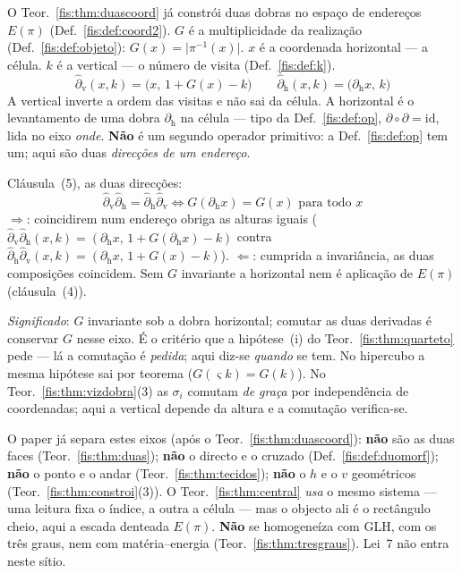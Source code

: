 \documentclass[livro.tex]{subfiles}
\begin{document}
\begin{observacao}\label{fis:obs:quantica-comuta-dobras}
O Teor.~\ref{fis:thm:duascoord} já constrói duas dobras no
espaço de endereços \(E(\pi)\) (Def.~\ref{fis:def:coord2}).
\(G\) é a multiplicidade da realização
(Def.~\ref{fis:def:objeto}): \(G(x)=\lvert\pi^{-1}(x)\rvert\).
\(x\) é a coordenada horizontal --- a célula.
\(k\) é a vertical --- o número de visita
(Def.~\ref{fis:def:k}).
\[
\boxed{\;
\hat\partial_{\mathrm{v}}(x,k)=\bigl(x,\,1+G(x)-k\bigr)
\qquad
\hat\partial_{\mathrm{h}}(x,k)=\bigl(\partial_{\mathrm{h}}x,\,k\bigr)
\;}
\]
A vertical inverte a ordem das visitas e não sai da célula.
A horizontal é o levantamento de uma dobra
\(\partial_{\mathrm{h}}\) na célula --- tipo da
Def.~\ref{fis:def:op}, \(\partial\circ\partial=\mathrm{id}\),
lida no eixo \emph{onde}.
\textbf{Não} é um segundo operador primitivo: a
Def.~\ref{fis:def:op} tem um; aqui são duas
\emph{direcções de um endereço}.

Cláusula~(5), as duas direcções:
\[
\boxed{\;
\hat\partial_{\mathrm{v}}\hat\partial_{\mathrm{h}}
=\hat\partial_{\mathrm{h}}\hat\partial_{\mathrm{v}}
\iff
G(\partial_{\mathrm{h}}x)=G(x)
\text{ para todo }x
\;}
\]
\(\Rightarrow\): coincidirem num endereço obriga as
alturas iguais
(\(\hat\partial_{\mathrm{v}}\hat\partial_{\mathrm{h}}(x,k)
=(\partial_{\mathrm{h}}x,\,1+G(\partial_{\mathrm{h}}x)-k)\)
contra
\(\hat\partial_{\mathrm{h}}\hat\partial_{\mathrm{v}}(x,k)
=(\partial_{\mathrm{h}}x,\,1+G(x)-k)\)).
\(\Leftarrow\): cumprida a invariância, as duas
composições coincidem. Sem \(G\) invariante a
horizontal nem é aplicação de \(E(\pi)\)
(cláusula~(4)).

\emph{Significado}: \(G\) invariante sob a dobra
horizontal; comutar as duas derivadas é conservar
\(G\) nesse eixo. É o critério que a hipótese~(i)
do Teor.~\ref{fis:thm:quarteto} pede --- lá a
comutação é \emph{pedida}; aqui diz-se
\emph{quando} se tem.
No hipercubo a mesma hipótese sai por teorema
(\(G(\varsigma k)=G(k)\)).
No Teor.~\ref{fis:thm:vizdobra}(3) as \(\sigma_i\)
comutam \emph{de graça} por independência de
coordenadas; aqui a vertical depende da altura e
a comutação verifica-se.

O paper já separa estes eixos
(após o Teor.~\ref{fis:thm:duascoord}):
\textbf{não} são as duas faces
(Teor.~\ref{fis:thm:duas});
\textbf{não} o directo e o cruzado
(Def.~\ref{fis:def:duomorf});
\textbf{não} o ponto e o andar
(Teor.~\ref{fis:thm:tecidos});
\textbf{não} o \(h\) e o \(v\) geométricos
(Teor.~\ref{fis:thm:constroi}(3)).
O Teor.~\ref{fis:thm:central} \emph{usa} o mesmo
sistema --- uma leitura fixa o índice, a outra a
célula --- mas o objecto ali é o rectângulo cheio,
aqui a escada denteada \(E(\pi)\).
\textbf{Não} se homogeneíza com GLH, com os três
graus, nem com matéria--energia
(Teor.~\ref{fis:thm:tresgraus}).
Lei~7 não entra neste sítio.


\end{observacao}
\end{document}
